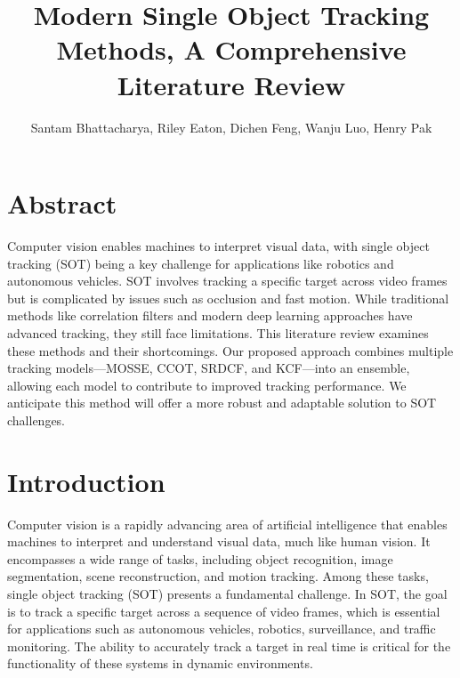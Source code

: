 \documentclass{article}
\title{Modern Single Object Tracking Methods, A Comprehensive Literature Review}
\author{Santam Bhattacharya, Riley Eaton, Dichen Feng, Wanju Luo, Henry Pak}
\begin{document}
\maketitle

\section{Abstract}

Computer vision enables machines to interpret visual data, with single object tracking (SOT) being a key challenge for applications like robotics and autonomous vehicles. SOT involves tracking a specific target across video frames but is complicated by issues such as occlusion and fast motion. While traditional methods like correlation filters and modern deep learning approaches have advanced tracking, they still face limitations. This literature review examines these methods and their shortcomings. Our proposed approach combines multiple tracking models—MOSSE, CCOT, SRDCF, and KCF—into an ensemble, allowing each model to contribute to improved tracking performance. We anticipate this method will offer a more robust and adaptable solution to SOT challenges.



\section{Introduction}

Computer vision is a rapidly advancing area of artificial intelligence that enables machines to interpret and understand visual data, much like human vision. It encompasses a wide range of tasks, including object recognition, image segmentation, scene reconstruction, and motion tracking. Among these tasks, single object tracking (SOT) presents a fundamental challenge. In SOT, the goal is to track a specific target across a sequence of video frames, which is essential for applications such as autonomous vehicles, robotics, surveillance, and traffic monitoring. The ability to accurately track a target in real time is critical for the functionality of these systems in dynamic environments.
\end{document}
